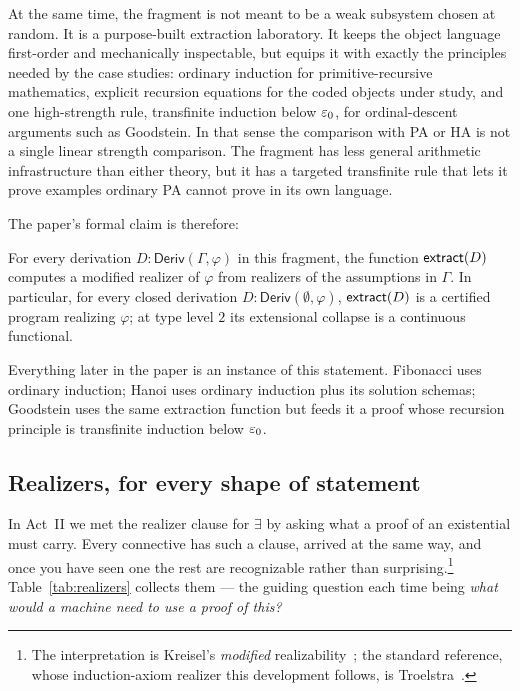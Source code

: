 \documentclass[11pt]{article}
\begin{document}
At the same time, the fragment is not meant to be a weak subsystem chosen at
random. It is a purpose-built extraction laboratory. It keeps the object
language first-order and mechanically inspectable, but equips it with exactly
the principles needed by the case studies: ordinary induction for
primitive-recursive mathematics, explicit recursion equations for the coded
objects under study, and one high-strength rule, transfinite induction below
$\varepsilon_0$, for ordinal-descent arguments such as Goodstein. In that sense the
comparison with PA or HA is not a single linear strength comparison. The
fragment has less general arithmetic infrastructure than either theory, but
it has a targeted transfinite rule that lets it prove examples ordinary PA
cannot prove in its own language.

The paper's formal claim is therefore:
\begin{keystmt}
For every derivation $D:\mathsf{Deriv}(\Gamma,\varphi)$ in this fragment, the
function $\mathsf{extract}(D)$ computes a modified realizer of $\varphi$ from
realizers of the assumptions in $\Gamma$. In particular, for every closed
derivation $D:\mathsf{Deriv}(\emptyset,\varphi)$, $\mathsf{extract}(D)$ is a certified
program realizing $\varphi$; at type level $2$ its extensional collapse is a
continuous functional.
\end{keystmt}
Everything later in the paper is an instance of this statement. Fibonacci
uses ordinary induction; Hanoi uses ordinary induction plus its solution
schemas; Goodstein uses the same extraction function but feeds it a proof
whose recursion principle is transfinite induction below $\varepsilon_0$.

\subsection*{Realizers, for every shape of statement}

In Act~II we met the realizer clause for $\exists$ by asking what a proof of
an existential must carry. Every connective has such a clause, arrived at the
same way, and once you have seen one the rest are recognizable rather than
surprising.\footnote{The interpretation is Kreisel's \emph{modified}
realizability~\citep{kreisel1959}; the standard reference, whose
induction-axiom realizer this development follows, is
Troelstra~\citep{troelstra1973}.} Table~\ref{tab:realizers} collects them --- the guiding question
each time being \emph{what would a machine need to use a proof of this?}
\end{document}

